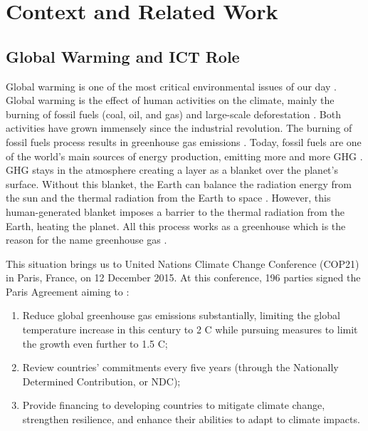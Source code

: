 \chapter{Context and Related Work}
\label{cha:related_work}
\minitoc

\section{Global Warming and ICT Role}
Global warming is one of the most critical environmental issues of our day \cite{houghton2005global}. Global warming is the effect of human activities on the climate, mainly the burning of fossil fuels (coal, oil, and gas) and large-scale deforestation \cite{houghton2005global}. Both activities have grown immensely since the industrial revolution. The burning of fossil fuels process results in greenhouse gas emissions \cite{olabi2022renewable}. Today, fossil fuels are one of the world's main sources of energy production, emitting more and more GHG \cite{olabi2022renewable}. GHG stays in the atmosphere creating a layer as a blanket over the planet's surface. Without this blanket, the Earth can balance the radiation energy from the sun and the thermal radiation from the Earth to space \cite{houghton2005global}. However, this human-generated blanket imposes a barrier to the thermal radiation from the Earth, heating the planet. All this process works as a greenhouse which is the reason for the name greenhouse gas \cite{houghton2005global}.

This situation brings us to United Nations Climate Change Conference (COP21) in Paris, France, on 12 December 2015. At this conference, 196 parties signed the Paris Agreement aiming to \cite{nations_paris_nodate}:
\begin{enumerate}
    \item Reduce global greenhouse gas emissions substantially, limiting the global temperature increase in this century to 2 \degree C while pursuing measures to limit the growth even further to 1.5 \degree C;
    \item Review countries’ commitments every five years (through the Nationally Determined Contribution, or NDC);
    \item Provide financing to developing countries to mitigate climate change, strengthen resilience, and enhance their abilities to adapt to climate impacts. 
\end{enumerate}

